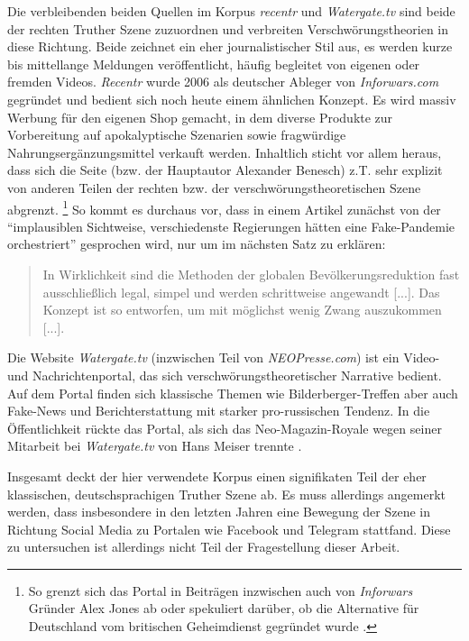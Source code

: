 Die verbleibenden beiden Quellen im Korpus \textit{recentr} und \textit{Watergate.tv} sind beide der rechten Truther Szene zuzuordnen und verbreiten Verschwörungstheorien in diese Richtung.
Beide zeichnet ein eher journalistischer Stil aus, es werden kurze bis mittellange Meldungen veröffentlicht, häufig begleitet von eigenen oder fremden Videos.
\textit{Recentr} wurde 2006 als deutscher Ableger von \textit{Inforwars.com} gegründet und bedient sich noch heute einem ähnlichen Konzept.
Es wird massiv Werbung für den eigenen Shop gemacht, in dem diverse Produkte zur Vorbereitung auf apokalyptische Szenarien sowie fragwürdige Nahrungsergänzungsmittel verkauft werden.
Inhaltlich sticht vor allem heraus, dass sich die Seite (bzw. der Hauptautor Alexander Benesch) z.T. sehr explizit von anderen Teilen der rechten bzw. der verschwörungstheoretischen Szene abgrenzt.
\footnote{So grenzt sich das Portal in Beiträgen inzwischen auch von \textit{Inforwars} Gründer Alex Jones ab \parencite{recentr-jones} oder spekuliert darüber, ob die Alternative für Deutschland vom britischen Geheimdienst gegründet wurde \parencite{recentr-afd}.}
So kommt es durchaus vor, dass in einem Artikel zunächst von der \enquote{implausiblen Sichtweise, verschiedenste Regierungen hätten eine Fake-Pandemie orchestriert} \parencite{recentr-population} gesprochen wird, nur um im nächsten Satz zu erklären: 

\begin{quotation}
    In Wirklichkeit sind die Methoden der globalen Bevölkerungsreduktion fast ausschließlich legal, simpel und werden schrittweise angewandt [...]. Das Konzept ist so entworfen, um mit möglichst wenig Zwang auszukommen [...]. \parencite{recentr-population}
\end{quotation} 

Die Website \textit{Watergate.tv} (inzwischen Teil von \textit{NEOPresse.com}) ist ein Video- und Nachrichtenportal, das sich verschwörungstheoretischer Narrative bedient. 
Auf dem Portal finden sich klassische Themen wie Bilderberger-Treffen \parencite[vgl.][]{watergate-bilderberger} aber auch Fake-News und Berichterstattung mit starker pro-russischen Tendenz.
In die Öffentlichkeit rückte das Portal, als sich das Neo-Magazin-Royale wegen seiner Mitarbeit bei \textit{Watergate.tv} von Hans Meiser trennte \parencite[vgl.][]{spiegel-watergate}.

Insgesamt deckt der hier verwendete Korpus einen signifikaten Teil der eher klassischen, deutschsprachigen Truther Szene ab.
Es muss allerdings angemerkt werden, dass insbesondere in den letzten Jahren eine Bewegung der Szene in Richtung Social Media zu Portalen wie Facebook und Telegram stattfand.
Diese zu untersuchen ist allerdings nicht Teil der Fragestellung dieser Arbeit.

